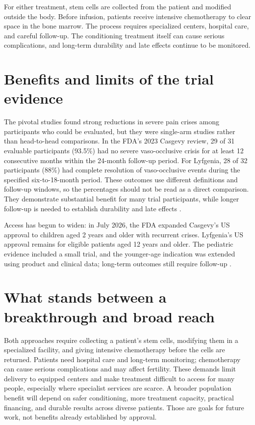 \documentclass[12pt,oneside]{book}
\begin{document}
For either treatment, stem cells are collected from the patient and modified
outside the body. Before infusion, patients receive intensive chemotherapy to
clear space in the bone marrow. The process requires specialized centers,
hospital care, and careful follow-up. The conditioning treatment itself can
cause serious complications, and long-term durability and late effects
continue to be monitored.

\section{Benefits and limits of the trial evidence}
The pivotal studies found strong reductions in severe pain crises among
participants who could be evaluated, but they were single-arm studies rather
than head-to-head comparisons. In the FDA's 2023 Casgevy review, 29 of 31
evaluable participants (93.5\%) had no severe vaso-occlusive crisis for at least
12 consecutive months within the 24-month follow-up period. For Lyfgenia, 28
of 32 participants (88\%) had complete resolution of vaso-occlusive events
during the specified six-to-18-month period. These outcomes use different
definitions and follow-up windows, so the percentages should not be read as a
direct comparison. They demonstrate substantial benefit for many trial
participants, while longer follow-up is needed to establish durability and
late effects \cite{fdaCasgevyReview,fdaSickleGeneTherapy}.

Access has begun to widen: in July 2026, the FDA expanded Casgevy's US approval
to children aged 2 years and older with recurrent crises. Lyfgenia's US
approval remains for eligible patients aged 12 years and older. The pediatric
evidence included a small trial, and the younger-age indication was extended
using product and clinical data; long-term outcomes still require follow-up
\cite{fdaCasgevyPediatric}.

\section{What stands between a breakthrough and broad reach}
Both approaches require collecting a patient's stem cells, modifying them in a
specialized facility, and giving intensive chemotherapy before the cells are
returned. Patients need hospital care and long-term monitoring; chemotherapy
can cause serious complications and may affect fertility. These demands limit
delivery to equipped centers and make treatment difficult to access for many
people, especially where specialist services are scarce. A broader population
benefit will depend on safer conditioning, more treatment capacity, practical
financing, and durable results across diverse patients. Those are goals for
future work, not benefits already established by approval.
\end{document}
